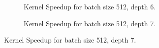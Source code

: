 \begin{figure}[ht]
  \centering
  \begin{subfigure}[b]{.3\textwidth}
    \caption{Kernel Speedup for batch size 512, depth 6.}
  \end{subfigure}
  \hfill  %
  \begin{subfigure}[b]{.3\textwidth}
    \caption{Kernel Speedup for batch size 512, depth 7.}
  \end{subfigure}
  \hfill

\end{figure}
